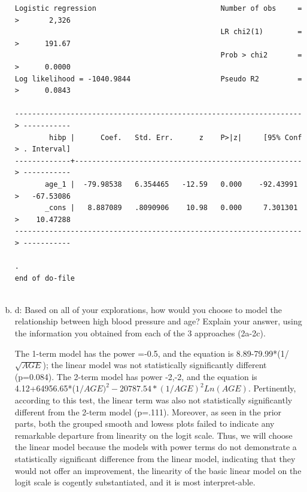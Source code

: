 \documentclass{article}
\begin{document}
\begin{enumerate}[a.]
\begin{verbatim}
Logistic regression                             Number of obs     =
>       2,326
                                                LR chi2(1)        =
>      191.67
                                                Prob > chi2       =
>      0.0000
Log likelihood = -1040.9844                     Pseudo R2         =
>      0.0843

-------------------------------------------------------------------
> -----------
        hibp |      Coef.   Std. Err.      z    P>|z|     [95% Conf
> . Interval]
-------------+-----------------------------------------------------
> -----------
       age_1 |  -79.98538   6.354465   -12.59   0.000    -92.43991 
>   -67.53086
       _cons |   8.887089   .8090906    10.98   0.000     7.301301 
>    10.47288
-------------------------------------------------------------------
> -----------

. 
end of do-file


	     \end{verbatim}
    
    \item d: Based on all of your explorations, how would you choose to model the relationship between high blood pressure and age?  Explain your answer, using the information you obtained from each of the 3 approaches (2a-2c). 
    
     The 1-term model has the power =-0.5, and the equation is 8.89-79.99*(1/$\sqrt{AGE}$); the linear model was not statistically significantly different (p=0.084).
     The 2-term model has power -2,-2, and the equation is 4.12+64956.65*($1/AGE)^{2} - 20787.54*(1/AGE)^{2}Ln(AGE)$. Pertinently, according to this test, the linear term was also not statistically significantly different from the 2-term model (p=.111). Moreover, as seen in the prior parts, both the grouped smooth and lowess plots failed to indicate any remarkable departure from linearity on the logit scale. Thus, we will choose the linear model because the models with power terms do not demonstrate a statistically significant difference from the linear model, indicating that they would not offer an improvement, the linearity of the basic linear model on the logit scale is cogently substantiated, and it is most interpret-able.
  \end{enumerate}
\end{document}
